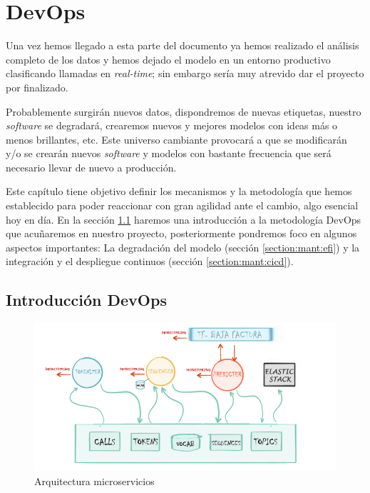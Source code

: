\chapter{DevOps}
\label{chapter:mant}

Una vez hemos llegado a esta parte del documento ya hemos realizado el análisis completo de los datos y hemos dejado el modelo en un entorno productivo clasificando llamadas en \textit{real-time}; sin embargo sería muy atrevido dar el proyecto por finalizado.

Probablemente surgirán nuevos datos, dispondremos de nuevas etiquetas, nuestro \textit{software} se degradará, crearemos nuevos y mejores modelos con ideas más o menos brillantes, etc. Este universo cambiante provocará a que se modificarán y/o se crearán nuevos \textit{software} y modelos con bastante frecuencia que será necesario llevar de nuevo a producción.  

Este capítulo tiene objetivo definir los mecanismos y la metodología que hemos establecido para poder reaccionar con gran agilidad ante el cambio, algo esencial hoy en día. En la sección \ref{section:mant:devops} haremos una introducción a la metodología DevOps que acuñaremos en nuestro proyecto, posteriormente pondremos foco en algunos aspectos importantes: La degradación del modelo (sección \ref{section:mant:efi}) y la integración y el despliegue continuos (sección \ref{section:mant:cicd}).


\section{Introducción DevOps}
\label{section:mant:devops}


\begin{figure}[!ht]
	\centering
	\includegraphics[width=1\textwidth]{images/exp/micro-arch-v3}
	\caption{Arquitectura microservicios}
	\label{fig:micro-arch}
\end{figure}

